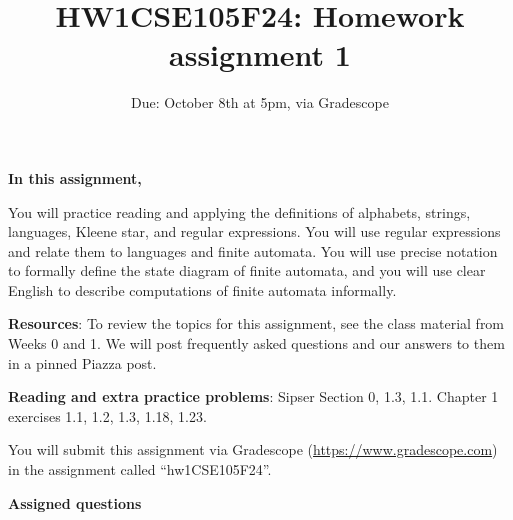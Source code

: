 

\title{HW1CSE105F24: Homework assignment 1}
\date{Due: October 8th at 5pm, via Gradescope}



\maketitle
\thispagestyle{fancy}

{\bf In this assignment,}

You will practice reading and
applying the definitions of alphabets, strings, languages, Kleene star, and regular expressions.
You will use regular expressions and relate them to languages and finite automata.
You will use precise notation to formally define the state diagram of finite automata,
and you will use clear English to describe computations of finite automata informally.


{\bf Resources}: To review the topics 
for this assignment, see the class material from Weeks 0 and 1.
We will post frequently asked questions and our answers to them in a 
pinned Piazza post.

{\bf Reading and extra practice problems}: Sipser Section 0, 1.3, 1.1.
Chapter 1 exercises 1.1, 1.2, 1.3, 1.18, 1.23.

\instructions

You will submit this assignment via Gradescope
(\href{https://www.gradescope.com}{https://www.gradescope.com}) 
in the assignment called ``hw1CSE105F24''.

{\bf Assigned questions}

